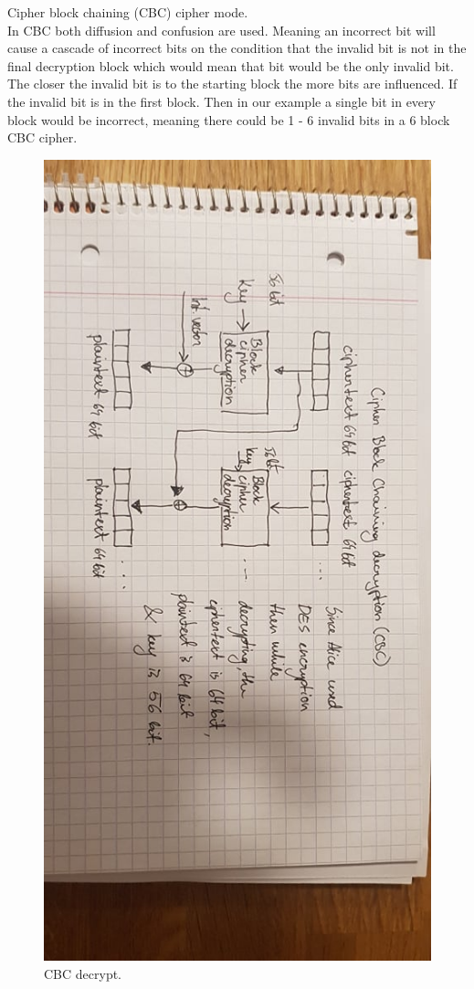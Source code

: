 \documentclass{article}
\begin{document}
\pagebreak
Cipher block chaining (CBC) cipher mode.\\
In CBC both diffusion and confusion are used. Meaning an incorrect bit will cause a cascade of incorrect bits
on the condition that the invalid bit is not in the final decryption block which would mean that bit would be the only invalid bit.
The closer the invalid bit is to the starting block the more bits are influenced.
If the invalid bit is in the first block. Then in our example a single bit in every block would be incorrect, meaning
there could be 1 - 6 invalid bits in a 6 block CBC cipher.
\begin{figure}[H]
    \centering
    \label{fig:cbc_decrypt}
    \includegraphics[scale=0.5, angle=90]{cbc_decrypt.jpg}
    \caption{CBC decrypt.}
\end{figure}
\end{document}
